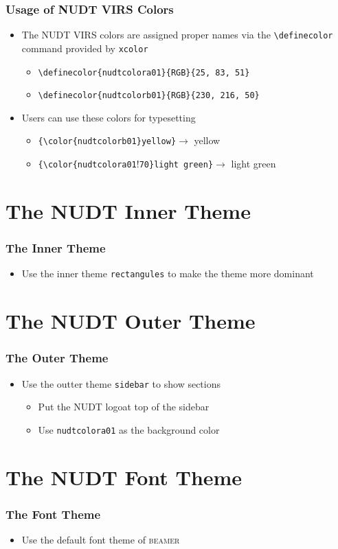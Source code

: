 \documentclass{beamer}
\begin{document}
\begin{frame}[fragile]
  \frametitle{Usage of NUDT VIRS Colors}
  \begin{itemize}
  \item The NUDT VIRS colors are assigned proper names via
    the \texttt{\textbackslash{}definecolor} command provided
    by \texttt{xcolor}
    \begin{itemize}
    \item \verb!\definecolor{nudtcolora01}{RGB}{25, 83, 51}!
    \item \verb!\definecolor{nudtcolorb01}{RGB}{230, 216, 50}!
    \end{itemize}
  \item Users can use these colors for typesetting
    \begin{itemize}
      \item \verb!{\color{nudtcolorb01}yellow}!$\rightarrow$ {\color{nudtcolorb01}yellow}
      \item \verb!{\color{nudtcolora01!!\verb!70}light green}!$\rightarrow$ {\color{nudtcolora01!70}light green}
    \end{itemize}
  \end{itemize}
\end{frame}

\section[Inner Theme]{The NUDT Inner Theme}

\begin{frame}
  \frametitle{The Inner Theme}
  \begin{itemize}
  \item Use the inner theme \texttt{rectangules} to make the theme more dominant
  \end{itemize}
\end{frame}

\section[Outer Theme]{The NUDT Outer Theme}

\begin{frame}
  \frametitle{The Outer Theme}
  \begin{itemize}
  \item Use the outter theme \texttt{sidebar} to show sections
    \begin{itemize}
    \item Put the NUDT logoat top of the sidebar
    \item Use \texttt{\color{nudtcolora01}nudtcolora01} as the background color
    \end{itemize}
  \end{itemize}
\end{frame}

\section[Font Theme]{The NUDT Font Theme}

\begin{frame}
  \frametitle{The Font Theme}
  \begin{itemize}
  \item Use the default font theme of \textsc{beamer}
  \end{itemize}
\end{frame}
\end{document}
